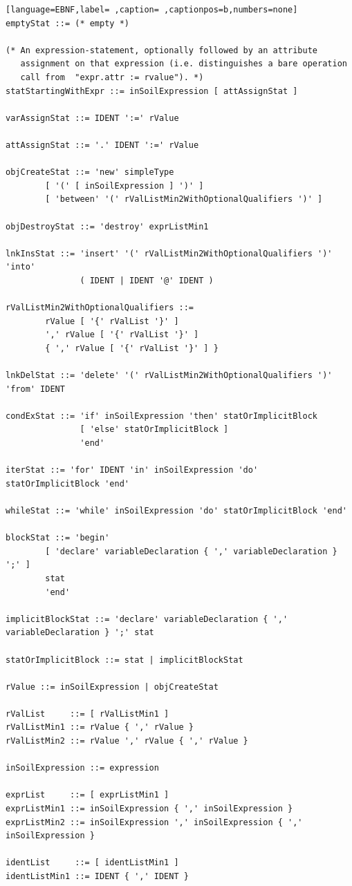 \documentclass[11pt,twoside,a4paper]{book}
\begin{document}
\begin{lstlisting}[language=EBNF,label= ,caption= ,captionpos=b,numbers=none]
emptyStat ::= (* empty *)

(* An expression-statement, optionally followed by an attribute
   assignment on that expression (i.e. distinguishes a bare operation
   call from  "expr.attr := rvalue"). *)
statStartingWithExpr ::= inSoilExpression [ attAssignStat ]

varAssignStat ::= IDENT ':=' rValue

attAssignStat ::= '.' IDENT ':=' rValue

objCreateStat ::= 'new' simpleType
        [ '(' [ inSoilExpression ] ')' ]
        [ 'between' '(' rValListMin2WithOptionalQualifiers ')' ]

objDestroyStat ::= 'destroy' exprListMin1

lnkInsStat ::= 'insert' '(' rValListMin2WithOptionalQualifiers ')' 'into'
               ( IDENT | IDENT '@' IDENT )

rValListMin2WithOptionalQualifiers ::=
        rValue [ '{' rValList '}' ]
        ',' rValue [ '{' rValList '}' ]
        { ',' rValue [ '{' rValList '}' ] }

lnkDelStat ::= 'delete' '(' rValListMin2WithOptionalQualifiers ')' 'from' IDENT

condExStat ::= 'if' inSoilExpression 'then' statOrImplicitBlock
               [ 'else' statOrImplicitBlock ]
               'end'

iterStat ::= 'for' IDENT 'in' inSoilExpression 'do' statOrImplicitBlock 'end'

whileStat ::= 'while' inSoilExpression 'do' statOrImplicitBlock 'end'

blockStat ::= 'begin'
        [ 'declare' variableDeclaration { ',' variableDeclaration } ';' ]
        stat
        'end'

implicitBlockStat ::= 'declare' variableDeclaration { ',' variableDeclaration } ';' stat

statOrImplicitBlock ::= stat | implicitBlockStat

rValue ::= inSoilExpression | objCreateStat

rValList     ::= [ rValListMin1 ]
rValListMin1 ::= rValue { ',' rValue }
rValListMin2 ::= rValue ',' rValue { ',' rValue }

inSoilExpression ::= expression

exprList     ::= [ exprListMin1 ]
exprListMin1 ::= inSoilExpression { ',' inSoilExpression }
exprListMin2 ::= inSoilExpression ',' inSoilExpression { ',' inSoilExpression }

identList     ::= [ identListMin1 ]
identListMin1 ::= IDENT { ',' IDENT }


\end{lstlisting}
\end{document}
